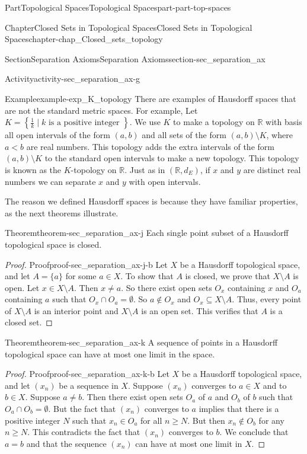 \documentclass[oneside,10pt,]{book}
\numberwithin{equation}{chapter}
\newcommand{\R}{\mathbb{R}}
\newcommand{\lt}{<}
\begin{document}
\begin{partptx}{Part}{Topological Spaces}{}{Topological Spaces}{}{}{part-part-top-spaces}
\begin{chapterptx}{Chapter}{Closed Sets in Topological Spaces}{}{Closed Sets in Topological Spaces}{}{}{chapter-chap_Closed_sets_topology}
\begin{sectionptx}{Section}{Separation Axioms}{}{Separation Axioms}{}{}{section-sec_separation_ax}
\begin{activity}{Activity}{}{activity-sec_separation_ax-g}
\end{activity}%
\begin{example}{Example}{}{example-exp_K_topology}%
There are examples of Hausdorff spaces that are not the standard metric spaces. For example, Let \(K = \left\{\frac{1}{k} \mid k \text{ is a positive integer } \right\}\). We use \(K\) to make a topology on \(\R\) with basis all open intervals of the form \((a,b)\) and all sets of the form \((a,b) \setminus K\), where \(a \lt b\) are real numbers. This topology adds the extra intervals of the form \((a,b) \setminus K\) to the standard open intervals to make a new topology. This topology is known as the \(K\)-topology on \(\R\). Just as in \((\R, d_E)\), if \(x\) and \(y\) are distinct real numbers we can separate \(x\) and \(y\) with open intervals.%
\end{example}
The reason we defined Hausdorff spaces is because they have familiar properties, as the next theorems illustrate.%
\begin{theorem}{Theorem}{}{}{theorem-sec_separation_ax-j}%
Each single point subset of a Hausdorff topological space is closed.%
\end{theorem}
\begin{proof}{Proof}{}{proof-sec_separation_ax-j-b}
Let \(X\) be a Hausdorff topological space, and let \(A = \{a\}\) for some \(a \in X\). To show that \(A\) is closed, we prove that \(X \setminus A\) is open. Let \(x \in X \setminus A\). Then \(x \neq a\). So there exist open sets \(O_x\) containing \(x\) and \(O_a\) containing \(a\) such that \(O_x \cap O_a = \emptyset\). So \(a \notin O_x\) and \(O_x \subseteq X \setminus A\). Thus, every point of \(X \setminus A\) is an interior point and \(X \setminus A\) is an open set. This verifies that \(A\) is a closed set.%
\end{proof}
\begin{theorem}{Theorem}{}{}{theorem-sec_separation_ax-k}%
A sequence of points in a Hausdorff topological space can have at most one limit in the space.%
\end{theorem}
\begin{proof}{Proof}{}{proof-sec_separation_ax-k-b}
Let \(X\) be a Hausdorff topological space, and let \((x_n)\) be a sequence in \(X\). Suppose \((x_n)\) converges to \(a \in X\) and to \(b \in X\). Suppose \(a \neq b\). Then there exist open sets \(O_a\) of \(a\) and \(O_b\) of \(b\) such that \(O_a \cap O_b = \emptyset\). But the fact that \((x_n)\) converges to \(a\) implies that there is a positive integer \(N\) such that \(x_n \in O_a\) for all \(n \geq N\). But then \(x_n \notin O_b\) for any \(n \geq N\). This contradicts the fact that \((x_n)\) converges to \(b\). We conclude that \(a=b\) and that the sequence \((x_n)\) can have at most one limit in \(X\).%

\end{proof}
\end{sectionptx}
\end{chapterptx}
\end{partptx}
\end{document}
